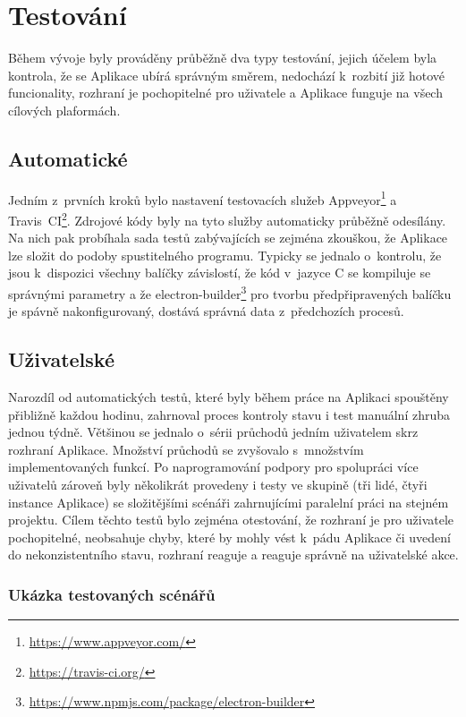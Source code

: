 \chapter{Testování}

Během vývoje byly prováděny průběžně dva typy testování, jejich účelem byla kontrola, že se Aplikace ubírá správným směrem, nedochází k~rozbití již hotové funcionality, rozhraní je pochopitelné pro uživatele a Aplikace funguje na všech cílových plaformách.

\section{Automatické}

Jedním z~prvních kroků bylo nastavení testovacích služeb Appveyor\footnote{\url{https://www.appveyor.com/}} a Travis~CI\footnote{\url{https://travis-ci.org/}}. Zdrojové kódy byly na tyto služby automaticky průběžně odesílány. Na nich pak probíhala sada testů zabývajících se zejména zkouškou, že Aplikace lze složit do podoby spustitelného programu. Typicky se jednalo o~kontrolu, že jsou k~dispozici všechny balíčky závislostí, že kód v~jazyce C se kompiluje se správnými parametry a že electron-builder\footnote{\url{https://www.npmjs.com/package/electron-builder}} pro tvorbu předpřipravených balíčku je spávně nakonfigurovaný, dostává správná data z~předchozích procesů.

\section{Uživatelské}

Narozdíl od automatických testů, které byly během práce na Aplikaci spouštěny přibližně každou hodinu, zahrnoval proces kontroly stavu i test manuální zhruba jednou týdně. Většinou se jednalo o~sérii průchodů jedním uživatelem skrz rozhraní Aplikace. Množství průchodů se zvyšovalo s~množstvím implementovaných funkcí. Po naprogramování podpory pro spolupráci více uživatelů zároveň byly několikrát provedeny i testy ve skupině (tři lidé, čtyři instance Aplikace) se složitějšími scénáři zahrnujícími paralelní práci na stejném projektu. Cílem těchto testů bylo zejména otestování, že rozhraní je pro uživatele pochopitelné, neobsahuje chyby, které by mohly vést k~pádu Aplikace či uvedení do nekonzistentního stavu, rozhraní reaguje a reaguje správně na uživatelské akce.

\subsection{Ukázka testovaných scénářů}

